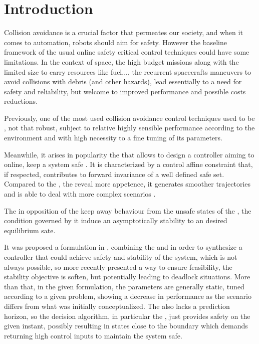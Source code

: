 
%

\chapter{Introduction}
\label{cha:introduction}

Collision avoidance is a crucial factor that permeates our society, and when it comes to automation, robots should aim for safety. However the baseline framework of the usual online safety critical control techniques could have some limitations. In the context of space, the high budget missions along with the limited size to carry resources like fuel..., the recurrent spacecrafts maneuvers to avoid collisions with debris \cite{hall2014history} (and other hazards), lead essentially to a need for safety and reliability, but welcome to improved performance and possible costs reductions.  

Previously, one of the most used collision avoidance control techniques used to be  \cite{khatib1986real}, not that robust, subject to relative  highly sensible performance according to the environment and with high necessity to a fine tuning of its parameters. 

Meanwhile, it arises in popularity the  that allows to design a controller aiming to online, keep a system safe \cite{ames2019control}. It is characterized by a control affine constraint that, if respected, contributes to forward invariance of a well defined safe set. Compared to the , the  reveal more appetence, it generates smoother trajectories and is able to deal with more complex scenarios \cite{singletary2021comparative}.

The  \cite{ames2014rapidly} in opposition of the keep away behaviour from the unsafe states of the , the condition governed by it induce an asymptotically stability to an desired equilibrium sate. 

It was proposed a  formulation in \cite{ames2014control}, combining the  and  in order to synthesize a controller that could achieve safety and stability of the system, which is not always possible, so more recently \cite{ames2019control} presented a way to ensure feasibility, the stability objective is soften, but potentially leading to deadlock situations. More than that, in the given formulation, the  parameters are generally static, tuned according to a given problem, showing a decrease in performance as the scenario differs from what was initially conceptualized. The  also lacks a prediction horizon, so the decision algorithm, in particular the , just provides safety on the given instant, possibly resulting in states close to the boundary which demands returning high control inputs to maintain the system safe.

